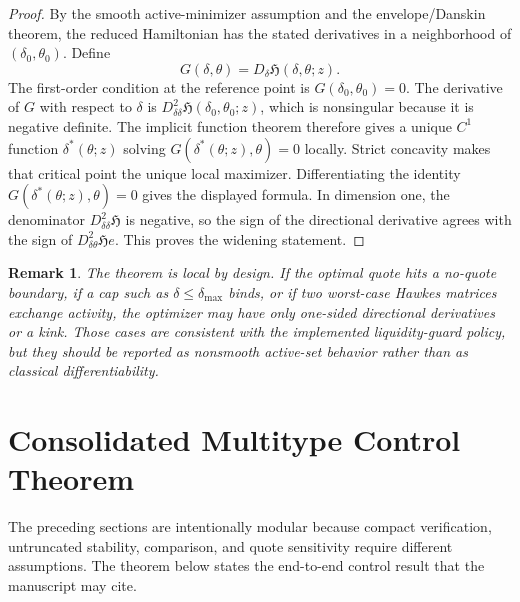 \documentclass[11pt]{article}
\newtheorem{remark}{Remark}
\begin{document}
\begin{proof}
By the smooth active-minimizer assumption and the envelope/Danskin theorem,
the reduced Hamiltonian has the stated derivatives in a neighborhood of
$(\delta_0,\theta_0)$. Define
\[
G(\delta,\theta)=D_\delta\mathfrak H(\delta,\theta;z).
\]
The first-order condition at the reference point is $G(\delta_0,\theta_0)=0$.
The derivative of $G$ with respect to $\delta$ is
$D^2_{\delta\delta}\mathfrak H(\delta_0,\theta_0;z)$, which is nonsingular
because it is negative definite. The implicit function theorem therefore gives
a unique $C^1$ function $\delta^*(\theta;z)$ solving
$G(\delta^*(\theta;z),\theta)=0$ locally. Strict concavity makes that critical
point the unique local maximizer. Differentiating the identity
$G(\delta^*(\theta;z),\theta)=0$ gives the displayed formula. In dimension
one, the denominator $D^2_{\delta\delta}\mathfrak H$ is negative, so the sign
of the directional derivative agrees with the sign of
$D^2_{\delta\theta}\mathfrak H e$. This proves the widening statement.
\end{proof}

\begin{remark}
The theorem is local by design. If the optimal quote hits a no-quote boundary,
if a cap such as $\delta\le\delta_{\max}$ binds, or if two worst-case Hawkes
matrices exchange activity, the optimizer may have only one-sided directional
derivatives or a kink. Those cases are consistent with the implemented
liquidity-guard policy, but they should be reported as nonsmooth active-set
behavior rather than as classical differentiability.
\end{remark}

\section{Consolidated Multitype Control Theorem}

The preceding sections are intentionally modular because compact verification,
untruncated stability, comparison, and quote sensitivity require different
assumptions. The theorem below states the end-to-end control result that the
manuscript may cite.
\end{document}
